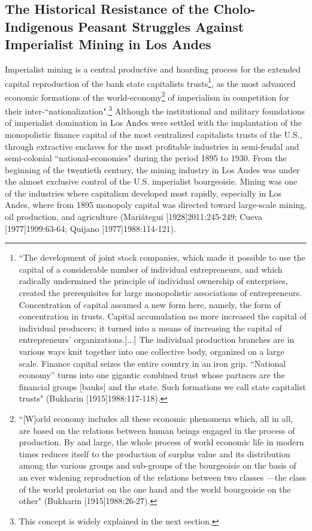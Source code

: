 \documentclass[]{interact}
\theoremstyle{plain}%
\theoremstyle{definition}
\theoremstyle{remark}
\begin{document}
\subsection{The Historical Resistance of the Cholo-Indigenous Peasant Struggles Against Imperialist Mining in Los Andes}

Imperialist mining is a central productive and hoarding process for the extended capital reproduction of the bank state capitalists trusts\footnote{“The development of joint  stock companies, which made it possible to use the capital of  a considerable number of individual entrepreneurs, and which  radically undermined the principle of individual ownership of  enterprises, created the prerequisites for large monopolistic associations of entrepreneurs. Concentration of capital assumed  a new form here, namely, the form of concentration in trusts. Capital accumulation no more increased the capital of individual producers; it turned into a means of increasing the capital of entrepreneurs’ organizations.[...] The individual  production branches are in various ways knit together into one collective body, organized on a large scale. Finance capital seizes the entire country in an iron grip. “National economy” turns into one gigantic combined trust whose partners are the financial groups [banks] and the state. Such formations we call state capitalist trusts" (Bukharin [1915]1988:117-118).}, as the most advanced economic formations of the world-economy\footnote{“[W]orld  economy includes all these economic phenomena which, all  in all, are based on the relations between human beings engaged in the process of production. By and large, the whole  process of world economic life in modern times reduces itself  to the production of surplus value and its distribution among the various groups and sub-groups of the bourgeoisie on the  basis of an ever widening reproduction of the relations between two classes —the class of the world proletariat on the one hand and the world bourgeoisie on the other" (Bukharin [1915]1988:26-27).} of imperialism in competition for their inter-“nationalization".\footnote{This concept is widely explained in the next section.}
Although the institutional and military foundations of imperialist domination in Los Andes were settled with the implantation of the monopolistic finance capital of the most centralized capitalists trusts of the U.S., through extractive enclaves for the most profitable industries in semi-feudal and semi-colonial “national-economies" during the period 1895 to 1930. From the beginning of the twentieth century, the mining industry in Los Andes was under the almost exclusive control of the U.S. imperialist bourgeoisie. Mining was one of the industries where capitalism developed most rapidly, especially in Los Andes, where from 1895 monopoly capital was directed toward large-scale mining, oil production, and agriculture (Mariátegui [1928]2011:245-249; Cueva [1977]1999:63-64; Quijano [1977]1988:114-121).
\end{document}
